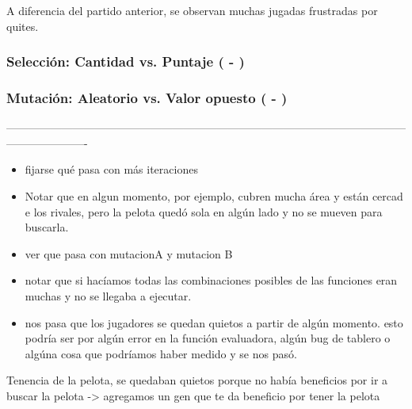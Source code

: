 
A diferencia del partido anterior, se observan muchas jugadas frustradas por quites.


\subsubsection*{Selección: Cantidad vs. Puntaje ( - )}
\subsubsection*{Mutación: Aleatorio vs. Valor opuesto ( - )}

----------------------------------------------------------------------------------------------------------------------------------
\begin{itemize}
    \item fijarse qué pasa con más iteraciones
    \item Notar que en algun momento, por ejemplo, cubren mucha área y están cercad e los rivales, pero la pelota quedó sola en algún lado y no se mueven para buscarla.
    \item ver que pasa con mutacionA y mutacion B
    \item notar que si hacíamos todas las combinaciones posibles de las funciones eran muchas y no se llegaba a ejecutar.
    \item nos pasa que los jugadores se quedan quietos a partir de algún momento. esto podría ser por algún error en la función evaluadora, algún bug de tablero o algúna cosa que podríamos haber medido y se nos pasó.
\end{itemize}

Tenencia de la pelota, se quedaban quietos porque no había beneficios por ir a buscar la pelota -> agregamos un gen que te da beneficio por tener la pelota

